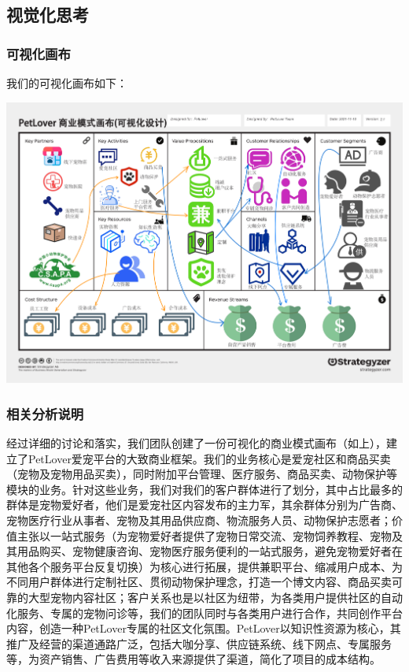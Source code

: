 \documentclass[a4paper]{ctexart}
\begin{document}
\subsection{视觉化思考}

\subsubsection{可视化画布}

我们的可视化画布如下：

\begin{center}
  \includegraphics[width=16cm]{可视化画布v2.1}
\end{center}

\subsubsection{相关分析说明}

经过详细的讨论和落实，我们团队创建了一份可视化的商业模式画布（如上），建立了PetLover爱宠平台的大致商业框架。我们的业务核心是爱宠社区和商品买卖（宠物及宠物用品买卖），同时附加平台管理、医疗服务、商品买卖、动物保护等模块的业务。针对这些业务，我们对我们的客户群体进行了划分，其中占比最多的群体是宠物爱好者，他们是爱宠社区内容发布的主力军，其余群体分别为广告商、宠物医疗行业从事者、宠物及其用品供应商、物流服务人员、动物保护志愿者；价值主张以一站式服务（为宠物爱好者提供了宠物日常交流、宠物饲养教程、宠物及其用品购买、宠物健康咨询、宠物医疗服务便利的一站式服务，避免宠物爱好者在其他各个服务平台反复切换）为核心进行拓展，提供兼职平台、缩减用户成本、为不同用户群体进行定制社区、贯彻动物保护理念，打造一个博文内容、商品买卖可靠的大型宠物内容社区；客户关系也是以社区为纽带，为各类用户提供社区的自动化服务、专属的宠物问诊等，我们的团队同时与各类用户进行合作，共同创作平台内容，创造一种PetLover专属的社区文化氛围。PetLover以知识性资源为核心，其推广及经营的渠道通路广泛，包括大咖分享、供应链系统、线下网点、专属服务等，为资产销售、广告费用等收入来源提供了渠道，简化了项目的成本结构。
\end{document}
